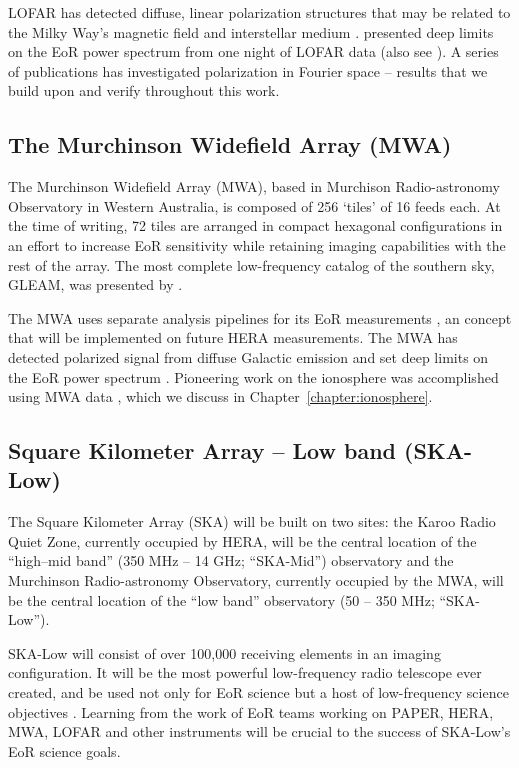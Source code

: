 LOFAR has detected diffuse, linear polarization structures that may be related to the Milky Way's magnetic field and interstellar medium \citep{Jelic.15}. \cite{Patil.17} presented deep limits on the EoR power spectrum from one night of LOFAR data (also see \citealt{Yatawatta.13}). A series of publications has investigated polarization in Fourier space \citep{Jelic.14, Asad.15, Asad.16, Asad.17} -- results that we build upon and verify throughout this work.

\subsection{The Murchinson Widefield Array (MWA)}
\label{subsec:mwa_instrument}

The Murchinson Widefield Array (MWA), based in Murchison Radio-astronomy Observatory in Western Australia, is composed of 256 `tiles' of 16 feeds each. At the time of writing, 72 tiles are arranged in compact hexagonal configurations in an effort to increase EoR sensitivity while retaining imaging capabilities with the rest of the array. The most complete low-frequency catalog of the southern sky, GLEAM, was presented by \cite{Hurley-Walker.17}.

The MWA uses separate analysis pipelines for its EoR measurements \citep{Sullivan.12, Jacobs.16, Trott.16}, an concept that will be implemented on future HERA measurements. The MWA has detected polarized signal from diffuse Galactic emission \citep{Lenc.16, Lenc.17} and set deep limits on the EoR power spectrum \citep[e.g.][]{Dillon.14, Dillon.15}. Pioneering work on the ionosphere was accomplished using MWA data \citep[e.g.][]{Loi.15}, which we discuss in Chapter~\ref{chapter:ionosphere}.

\subsection{Square Kilometer Array -- Low band (SKA-Low)}
\label{subsec:skalow_instrument}

The Square Kilometer Array (SKA) will be built on two sites: the Karoo Radio Quiet Zone, currently occupied by HERA, will be the central location of the ``high--mid band'' (350 MHz -- 14 GHz; ``SKA-Mid'') observatory and the Murchinson Radio-astronomy Observatory, currently occupied by the MWA, will be the central location of the ``low band'' observatory (50 -- 350 MHz; ``SKA-Low'').

SKA-Low will consist of over 100,000 receiving elements in an imaging configuration. It will be the most powerful low-frequency radio telescope ever created, and be used not only for EoR science but a host of low-frequency science objectives \citep[e.g.][]{SKABook, Schilizzi.07, Dewdney.09}. Learning from the work of EoR teams working on PAPER, HERA, MWA, LOFAR and other instruments will be crucial to the success of SKA-Low's EoR science goals.
